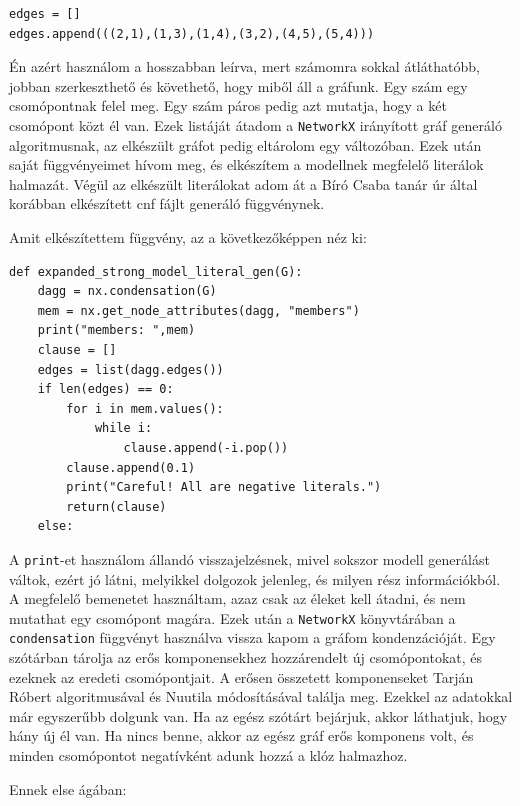 \documentclass[
]{thesis-ekf}
\theoremstyle{definition}
\theoremstyle{remark}
\begin{document}
	\begin{lstlisting}
edges = []
edges.append(((2,1),(1,3),(1,4),(3,2),(4,5),(5,4)))
	\end{lstlisting}
	
	Én azért használom a hosszabban leírva, mert számomra sokkal átláthatóbb, jobban szerkeszthető és követhető, hogy miből áll a gráfunk. Egy szám egy csomópontnak felel meg. Egy szám páros pedig azt mutatja, hogy a két csomópont közt él van. Ezek listáját átadom a \texttt{NetworkX} irányított gráf generáló algoritmusnak, az elkészült gráfot pedig eltárolom egy változóban. Ezek után saját függvényeimet hívom meg, és elkészítem a modellnek megfelelő literálok halmazát. Végül az elkészült literálokat adom át a Bíró Csaba tanár úr által korábban elkészített cnf fájlt generáló függvénynek.
	
	Amit elkészítettem függvény, az a következőképpen néz ki:
	
	\begin{lstlisting}
def expanded_strong_model_literal_gen(G):
	dagg = nx.condensation(G)
	mem = nx.get_node_attributes(dagg, "members")
	print("members: ",mem)
	clause = []
	edges = list(dagg.edges())
	if len(edges) == 0:
		for i in mem.values():
			while i:
				clause.append(-i.pop())
		clause.append(0.1)
		print("Careful! All are negative literals.")
		return(clause)
	else:
	\end{lstlisting}

	A \texttt{print}-et használom állandó visszajelzésnek, mivel sokszor modell generálást váltok, ezért jó látni, melyikkel dolgozok jelenleg, és milyen rész információkból. A megfelelő bemenetet használtam, azaz csak az éleket kell átadni, és nem mutathat egy csomópont magára. Ezek után a \texttt{NetworkX} könyvtárában a \texttt{condensation} függvényt használva vissza kapom a gráfom kondenzációját. Egy szótárban tárolja az erős komponensekhez hozzárendelt új csomópontokat, és ezeknek az eredeti csomópontjait. A erősen összetett komponenseket Tarján Róbert algoritmusával \cite{tarjan} és Nuutila módosításával \cite{nuutila} találja meg. Ezekkel az adatokkal már egyszerűbb dolgunk van. Ha az egész szótárt bejárjuk, akkor láthatjuk, hogy hány új él van. Ha nincs benne, akkor az egész gráf erős komponens volt, és minden csomópontot negatívként adunk hozzá a klóz halmazhoz.
	
	Ennek else ágában:
\end{document}
